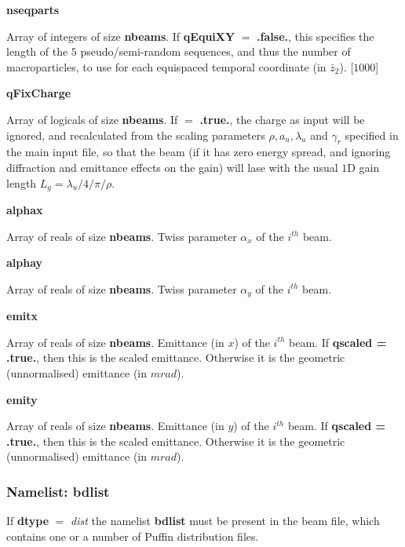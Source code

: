 \documentclass[12pt]{article}%
\begin{document}
{\bf nseqparts}

Array of integers of size {\bf nbeams}. If {\bf qEquiXY} $=$ {\bf .false.}, this specifies the length of the $5$ pseudo/semi-random sequences, and thus the number of macroparticles, to use for each equispaced temporal coordinate (in $\bar{z}_2$). [$1000$]




{\bf qFixCharge}

Array of logicals of size {\bf nbeams}. If $=$ {\bf .true.}, the charge as input will be ignored, and recalculated from the scaling parameters $\rho, a_u, \lambda_u$ and $\gamma_r$ specified in the main input file, so that the beam (if it has zero energy spread, and ignoring diffraction and emittance effects on the gain) will lase with the usual $1$D gain length $L_g = \lambda_u / 4 / \pi / \rho$.

{\bf alphax}

Array of reals of size {\bf nbeams}. Twiss parameter $\alpha_x$ of the $i^{th}$ beam.

{\bf alphay}

Array of reals of size {\bf nbeams}. Twiss parameter $\alpha_y$ of the $i^{th}$ beam.

{\bf emitx}

Array of reals of size {\bf nbeams}. Emittance (in $x$) of the $i^{th}$ beam. If {\bf qscaled = .true.}, then this is the scaled emittance. Otherwise it is the geometric (unnormalised) emittance (in $m rad$).

{\bf emity}

Array of reals of size {\bf nbeams}. Emittance (in $y$) of the $i^{th}$ beam. If {\bf qscaled = .true.}, then this is the scaled emittance. Otherwise it is the geometric (unnormalised) emittance (in $m rad$).



%




\subsubsection{Namelist: bdlist}

If {\bf dtype} $=$ {\it dist} the namelist {\bf bdlist} must be present in the beam file, which contains one or a number of Puffin distribution files.
\end{document}
